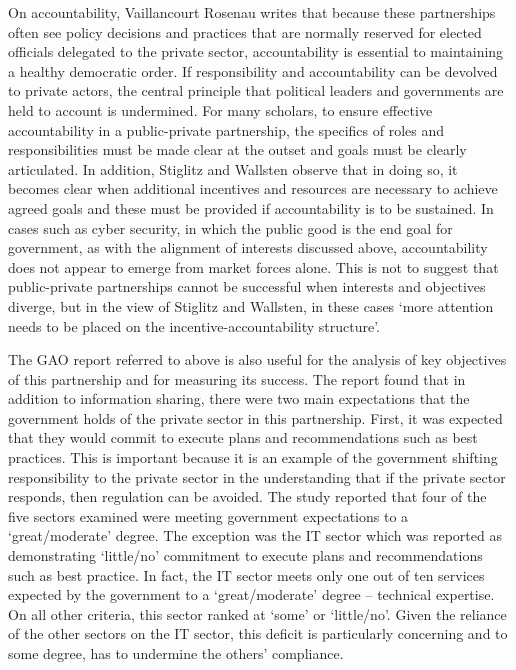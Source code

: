 \documentclass[a4paper,11pt]{article}
\begin{document}
On accountability, Vaillancourt Rosenau writes that because these
partnerships often see policy decisions and practices that are
normally reserved for elected officials delegated to the private
sector, accountability is essential to maintaining a healthy
democratic order. If responsibility and accountability can be devolved
to private actors, the central principle that political leaders and
governments are held to account is undermined.  For many scholars, to
ensure effective accountability in a public-private partnership, the
specifics of roles and responsibilities must be made clear at the
outset  and goals must be clearly articulated.  In addition, Stiglitz
and Wallsten observe that in doing so, it becomes clear when
additional incentives and resources are necessary to achieve agreed
goals and these must be provided if accountability is to be sustained.
In cases such as cyber security, in which the public good is the end
goal for government, as with the alignment of interests discussed
above, accountability does not appear to emerge from market forces
alone.   This is not to suggest that public-private partnerships
cannot be successful when interests and objectives diverge, but in the
view of Stiglitz and Wallsten, in these cases `more attention needs to
be placed on the incentive-accountability structure'.  

The GAO report referred to above is also useful for the analysis of
key objectives of this partnership and for measuring its success.
The report found that in addition to information sharing, there were
two main expectations that the government holds of the private sector
in this partnership. First, it was expected that they would commit to
execute plans and recommendations such as best practices.   This is
important because it is an example of the government shifting
responsibility to the private sector in the understanding that if the
private sector responds, then regulation can be avoided. The study
reported that four of the five sectors examined were meeting
government expectations to a `great/moderate' degree. The exception
was the IT sector which was reported as demonstrating ‘little/no’
commitment to execute plans and recommendations such as best practice.
In fact, the IT sector meets only one out of ten services expected by
the government to a `great/moderate' degree – technical expertise. On
all other criteria, this sector ranked at `some' or `little/no'. Given
the reliance of the other sectors on the IT sector, this deficit is
particularly concerning and to some degree, has to undermine the
others' compliance.
\end{document}
